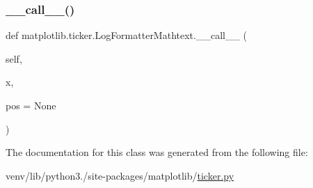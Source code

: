 \subsubsection{\texorpdfstring{\+\_\+\+\_\+call\+\_\+\+\_\+()}{\_\_call\_\_()}}
{\footnotesize\ttfamily def matplotlib.\+ticker.\+Log\+Formatter\+Mathtext.\+\_\+\+\_\+call\+\_\+\+\_\+ (\begin{DoxyParamCaption}\item[{}]{self,  }\item[{}]{x,  }\item[{}]{pos = {\ttfamily None} }\end{DoxyParamCaption})}



The documentation for this class was generated from the following file\+:\begin{DoxyCompactItemize}
\item 
venv/lib/python3./site-\/packages/matplotlib/\hyperlink{ticker_8py}{ticker.\+py}\end{DoxyCompactItemize}

